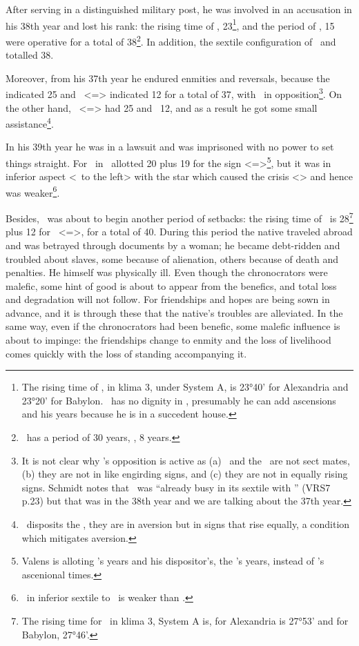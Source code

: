 After serving in a distinguished military post, he was involved in an accusation in his 38th year and lost his rank: the rising time of \Taurus, 23\footnote{The rising time of \Taurus, in klima 3, under System A, is 23°40' for Alexandria and 23°20' for Babylon. \Mars\, has no dignity in \Taurus, presumably he can add ascensions and his years because he is in a succedent house.}, and the period of \Mars, 15 were operative for a total of 38\footnote{\Saturn\, has a period of 30 years, \Venus, 8 years.}. In addition, the sextile configuration of \Saturn\, and \Venus\, totalled 38. 

Moreover, from his 37th year he endured enmities and reversals, because the \Moon\, indicated 25 and \Sagittarius\, <=\Jupiter> indicated 12 for a total of 37, with \Saturn\, in opposition\footnote{It is not clear why \Saturn's opposition is active as (a) \Saturn\, and the \Moon\, are not sect mates, (b) they are not in like engirding signs, and (c) they are not in equally rising signs. Schmidt notes that \Saturn\, was ``already busy in its sextile with \Venus'' (VRS7 p.23) but that was in the 38th year and we are talking about the 37th year.}. On the other hand, \Cancer\, <=\Moon> had 25 and \Jupiter\, 12, and as a result he got some small assistance\footnote{\Jupiter\, disposits the \Moon, they are in aversion but in signs that rise equally, a condition which mitigates aversion.}. 

In his 39th year he was in a lawsuit and was imprisoned with no power to set things straight. For \Mercury\, in \Leo\, allotted 20
plus 19 for the sign <=\Sun>\footnote{Valens is alloting \Mercury's years and his dispositor's, the \Sun's years, instead of \Leo's ascenional times.}, but it was in inferior aspect <\Sextile\, to the left> with the star which caused the crisis <\Saturn> and hence was weaker\footnote{\Mercury\, in inferior sextile to \Saturn\, is weaker than \Saturn.}. 

Besides, \Saturn\, was about to begin another period of setbacks: the rising time of \Gemini\, is 28\footnote{The rising time for \Gemini\, in klima 3, System A is, for Alexandria is 27°53' and for Babylon, 27°46'.} plus 12 for \Sagittarius\, <=\Jupiter>, for a total of 40. During this period the native traveled abroad and was betrayed through documents by a woman; he became debt-ridden and troubled about slaves, some because of alienation, others because of death and penalties. He himself was physically ill. Even though the chronocrators were malefic, some hint of good is about to appear from the benefics, and total loss and degradation will not follow. For friendships and hopes are being sown in advance, and it is through these that the native’s troubles are alleviated. In the same way, even if the chronocrators had been benefic, some malefic influence is about to impinge: the friendships change to enmity and the loss of livelihood comes quickly with the loss of standing accompanying it. 

